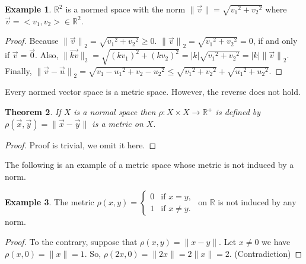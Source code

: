 \documentclass[12pt, reqno]{amsart}
\newtheorem{theorem}{Theorem}[section]
\theoremstyle{definition}
\newtheorem{example}[theorem]{Example}
\numberwithin{equation}{section}
\newcommand{\dR}{{\mathbb R}}
\begin{document}
     \begin{example}
         $\dR^2$ is a normed space with the norm $\lVert\vec{v}\rVert = \sqrt{{v_1}^2 +{v_2}^2}$ where $\vec{v}=<v_1,v_2> \in \dR^2$.
    \begin{proof}
        Because ${\| \vec{v} \|}_2 = \sqrt{{v_1}^2 +{v_2}^2}\geq 0.$ ${\| \vec{v} \|}_2 = \sqrt{{v_1}^2 +{v_2}^2}= 0$, if and only if  $\vec{v}=\vec{0}.$ Also, $\| \vec{kv} \|_2 = \sqrt{{(k v_1)}^2 +{(k v_2)}^2}=|k| \sqrt{{v_1}^2 +{v_2}^2}=|k|{\| \vec{v} \|}_2.$
        Finally, ${\| \vec{v}-\vec{u} \|}_2 = \sqrt{{v_1-u_1}^2 +{v_2-u_2}^2}\leq \sqrt{{v_1}^2 +{v_2}^2}+\sqrt{{u_1}^2 +{u_2}^2}.$
    \end{proof}
    \end{example}
     Every normed vector space is a metric space. However, the reverse does not hold. 
    \begin{theorem} If $X$ is a normal space then $\rho: X\times X\to \dR^+$ is defined by
     $\rho(\vec{x},\vec{y})=\lVert \vec{x} -\vec{y}\rVert$ is a metric on $X.$
     \end{theorem}
     \begin{proof}
     Proof is trivial, we omit it here.   
     \end{proof}
     The following is an example of a metric space whose metric is not induced by a norm.
    \begin{example}
     The metric  $\rho(x, y) = \begin{cases}
            0 & \text{if } x = y,\\
            1 & \text{if } x \neq y.\end{cases}$ on $\dR$ is not induced by any norm.
    \end{example}
    \begin{proof}
    To the contrary, suppose that $\rho(x, y)=\lVert x - y\rVert.$   Let $x\neq 0$ we have $\rho(x, 0)=\lVert x\rVert=1$. So, $\rho(2x, 0)=\lVert 2x\rVert=2\lVert x\rVert=2$. (Contradiction)
    \end{proof}
 
\end{document}
